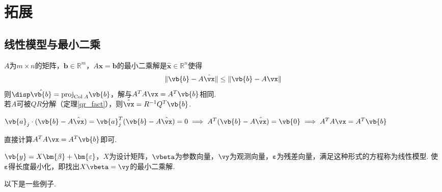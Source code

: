 
\section{拓展}
\subsection{线性模型与最小二乘}%
\begin{theorem}[最小二乘]
$A$为$m\times n$的矩阵，$\mathbf{b}\in\mathbb{R}^m$，$A\mathbf{x}=\mathbf{b}$的最小二乘解是$\hat{\mathbf{x}}\in\mathbb{R}^n$使得
\[\|\vb{b}-A\hat{\vx}\|\leq\|\vb{b}-A\vx\|\]
则$\disp\hat{\vb{b}}=\mathrm{proj}_{\mathrm{Col}\;A}\vb{b}$，解与$A^TA\vx=A^T\vb{b}$相同.\\
若$A$可被$QR$分解（定理\ref{qr_fact}），则$\hat{\vx}=R^{-1}Q^T\vb{b}$.
\end{theorem}
\begin{analysis}
$\vb{a}_j\cdot(\vb{b}-A\hat{\vx})=\vb{a}_j^T(\vb{b}-A\hat{\vx})=0\implies A^T(\vb{b}-A\hat{\vx})=\vb{0}\implies A^TA\vx=A^T\vb{b}$
\end{analysis}
\begin{myalgorithm}[最小二乘估计]
直接计算$A^TA\vx=A^T\vb{b}$即可.
\end{myalgorithm}
\begin{definition}[一般线性模型]
$\vb{y}=X\bm{\beta}+\bm{\varepsilon}$，$X$为设计矩阵，$\vbeta$为参数向量，$\vy$为观测向量，$\bm{\varepsilon}$为残差向量，满足这种形式的方程称为线性模型. 使$\bm{\varepsilon}$得长度最小化，即找出$X\vbeta=\vy$的最小二乘解.
\end{definition}
以下是一些例子.
